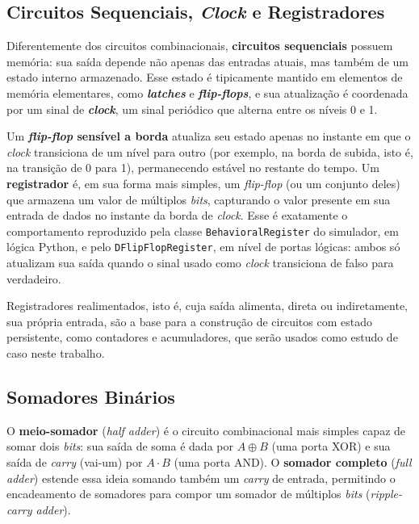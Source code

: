 \subsection{Circuitos Sequenciais, \textit{Clock} e Registradores}

Diferentemente dos circuitos combinacionais, \textbf{circuitos sequenciais} possuem memória: sua saída depende não apenas das entradas atuais, mas também de um estado interno armazenado. Esse estado é tipicamente mantido em elementos de memória elementares, como \textbf{\textit{latches}} e \textbf{\textit{flip-flops}}, e sua atualização é coordenada por um sinal de \textbf{\textit{clock}}, um sinal periódico que alterna entre os níveis 0 e 1.

Um \textbf{\textit{flip-flop} sensível a borda} atualiza seu estado apenas no instante em que o \textit{clock} transiciona de um nível para outro (por exemplo, na borda de subida, isto é, na transição de 0 para 1), permanecendo estável no restante do tempo. Um \textbf{registrador} é, em sua forma mais simples, um \textit{flip-flop} (ou um conjunto deles) que armazena um valor de múltiplos \textit{bits}, capturando o valor presente em sua entrada de dados no instante da borda de \textit{clock}. Esse é exatamente o comportamento reproduzido pela classe \texttt{BehavioralRegister} do simulador, em lógica Python, e pelo \texttt{DFlipFlopRegister}, em nível de portas lógicas: ambos só atualizam sua saída quando o sinal usado como \textit{clock} transiciona de falso para verdadeiro.

Registradores realimentados, isto é, cuja saída alimenta, direta ou indiretamente, sua própria entrada, são a base para a construção de circuitos com estado persistente, como contadores e acumuladores, que serão usados como estudo de caso neste trabalho.

\subsection{Somadores Binários}

O \textbf{meio-somador} (\textit{half adder}) é o circuito combinacional mais simples capaz de somar dois \textit{bits}: sua saída de soma é dada por $A \oplus B$ (uma porta XOR) e sua saída de \textit{carry} (vai-um) por $A \cdot B$ (uma porta AND). O \textbf{somador completo} (\textit{full adder}) estende essa ideia somando também um \textit{carry} de entrada, permitindo o encadeamento de somadores para compor um somador de múltiplos \textit{bits} (\textit{ripple-carry adder}).

